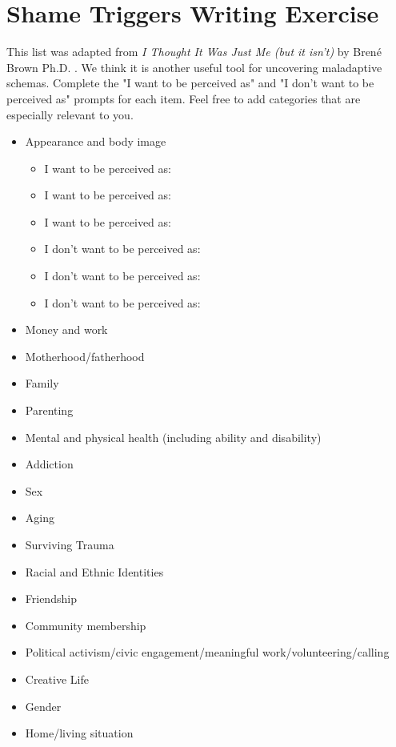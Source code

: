 \documentclass[12pt,letterpaper]{book}
\begin{document}
\chapter{Shame Triggers Writing Exercise}
\label{sec:shametriggers}
This list was adapted from \textit{I Thought It Was Just Me (but it isn't)} by Brené Brown Ph.D. \cite{brownThought}. We think it is another useful tool for uncovering maladaptive schemas. Complete the "I want to be perceived as" and "I don't want to be perceived as" prompts for each item. Feel free to add categories that are especially relevant to you.

\begin{itemize}
    \item Appearance and body image
    \begin{itemize}
        \item I want to be perceived as:
        \item I want to be perceived as:
        \item I want to be perceived as:
        \item I don't want to be perceived as:
        \item I don't want to be perceived as:
        \item I don't want to be perceived as:
    \end{itemize}
    \item Money and work
    \item Motherhood/fatherhood
    \item Family
    \item Parenting
    \item Mental and physical health (including ability and disability)
    \item Addiction
    \item Sex
    \item Aging
    \item Surviving Trauma
    \item Racial and Ethnic Identities
    \item Friendship
    \item Community membership
    \item Political activism/civic engagement/meaningful work/volunteering/calling
    \item Creative Life
    \item Gender
    \item Home/living situation
\end{itemize}
\end{document}
